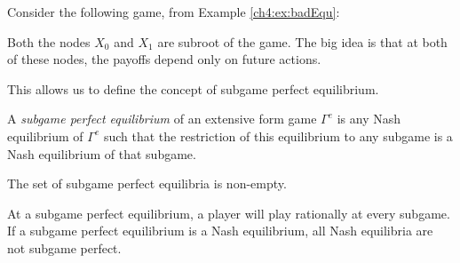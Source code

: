 \begin{example}
Consider the following game, from Example \ref{ch4:ex:badEqu}:
\begin{figure}[!ht]
\begin{center}
\end{center}
\end{figure}

Both the nodes $X_0$ and $X_1$ are subroot of the game.
The big idea is that at both of these nodes, the payoffs depend only on future actions.
\label{ch5:ex:subgame1}
\end{example}
This allows us to define the concept of subgame perfect equilibrium.
\begin{definition}
A \emph{subgame perfect equilibrium} of an extensive form game $\Gamma^e$ is any Nash equilibrium of $\Gamma^e$ such that the restriction of this equilibrium to any subgame is a Nash equilibrium of that subgame.
\end{definition}
\begin{theorem}
The set of subgame perfect equilibria is non-empty.
\end{theorem}
At a subgame perfect equilibrium, a player will play rationally at every subgame.
If a subgame perfect equilibrium is a Nash equilibrium, all Nash equilibria are not subgame perfect.
